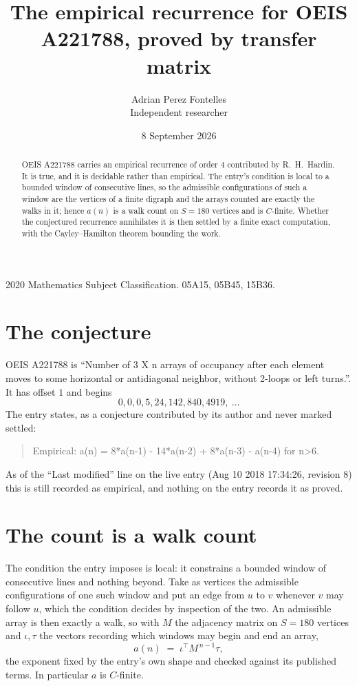 \documentclass[11pt,a4paper]{article}
\title{The empirical recurrence for OEIS A221788, proved by transfer matrix}
\author{Adrian Perez Fontelles\\ \small Independent researcher}
\date{8 September 2026}
\theoremstyle{plain}
\theoremstyle{definition}
\begin{document}
\maketitle

\begin{abstract}
OEIS A221788 carries an empirical recurrence of order $4$ contributed by R.~H.~Hardin. It is
true, and it is decidable rather than empirical. The entry's condition is local to a bounded window of consecutive lines, so
the admissible configurations of such a window are the vertices of a finite digraph and the
arrays counted are exactly the walks in it; hence $a(n)$ is a walk count on $S=180$ vertices
and is $C$-finite. Whether the conjectured recurrence annihilates it is then settled by a
finite exact computation, with the Cayley--Hamilton theorem bounding the work.
\end{abstract}

\noindent\small 2020 Mathematics Subject Classification. 05A15, 05B45, 15B36.\normalsize

\section{The conjecture}

OEIS A221788 is ``Number of 3 X n arrays of occupancy after each element moves to some horizontal or antidiagonal neighbor, without 2-loops or left turns.''. It has offset $1$ and begins
\[
0, 0, 0, 5, 24, 142, 840, 4919,\ \dots
\]
The entry states, as a conjecture contributed by its author and never marked settled:
\begin{quote}
Empirical: a(n) = 8*a(n-1) - 14*a(n-2) + 8*a(n-3) - a(n-4) for n>6.
\end{quote}
As of the ``Last modified'' line on the live entry (Aug 10 2018 17:34:26, revision 8) this is still
recorded as empirical, and nothing on the entry records it as proved.

\section{The count is a walk count}

The condition the entry imposes is local: it constrains a bounded window of consecutive lines and nothing beyond. Take as
vertices the admissible configurations of one such window and put an edge from $u$ to $v$
whenever $v$ may follow $u$, which the condition decides by inspection of the two. An
admissible array is then exactly a walk, so with $M$ the adjacency matrix on $S=180$ vertices
and $\iota,\tau$ the vectors recording which windows may begin and end an array,
\[
a(n)\;=\;\iota^{\!\top}M^{\,n-1}\tau ,
\]
the exponent fixed by the entry's own shape and checked against its published terms. In
particular $a$ is $C$-finite.
\end{document}

